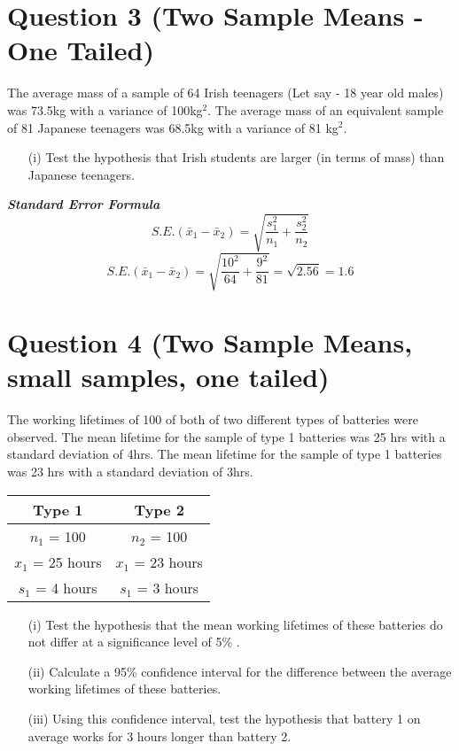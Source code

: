 \documentclass[a4paper,12pt]{article}
\begin{document}
\section*{Question 3 (Two Sample Means - One Tailed)}
The average mass of a sample of 64 Irish teenagers (Let say - 18 year old males) was 73.5kg with a variance of 100kg$^2$. 
The average mass of an equivalent sample of 81 Japanese teenagers was 68.5kg with a variance of 81 kg$^2$. 
\begin{itemize}
\item[(i)] Test the hypothesis that Irish students are larger (in terms of mass) than Japanese teenagers.
\end{itemize}

\textbf{\textit{Standard Error Formula}}
\[ S.E.(\bar{x}_1 - \bar{x}_2)  = \sqrt{\frac{s_1^2}{n_1} + \frac{s_2^2}{n_2}} \]
\[ S.E.(\bar{x}_1 - \bar{x}_2)  = \sqrt{\frac{10^2}{64} + \frac{9^2}{81}}  = \sqrt{2.56} = 1.6\]
\newpage


\section*{Question 4 (Two Sample Means, small samples, one tailed)}
The working lifetimes of 100 of both of two different types of batteries were observed. The mean lifetime for the sample of type 1 batteries was 25 hrs with a standard deviation of 4hrs. The mean lifetime for the sample of type 1 batteries was 23 hrs with a standard deviation of 3hrs. 
\begin{center}
\begin{tabular}{|c||c|}
\hline 
Type 1 & Type 2 \\ \hline \hline
$n_1$ = 100 & $n_2$ = 100 \\ \hline
$x_1$ = 25 hours & $x_1$ = 23 hours \\ \hline
$s_1$ = 4 hours & $s_1$ = 3 hours \\ \hline
\end{tabular} 
\end{center}
\begin{itemize}
\item[(i)] Test the hypothesis that the mean working lifetimes of these batteries do not differ at a significance level of 5\% .

\item[(ii)] Calculate a 95\% confidence interval for the difference between the average working lifetimes of these batteries. 
\item[(iii)] Using this confidence interval, test the hypothesis that battery 1 on average works for 3 hours longer than battery 2.
\end{itemize}
\end{document}
